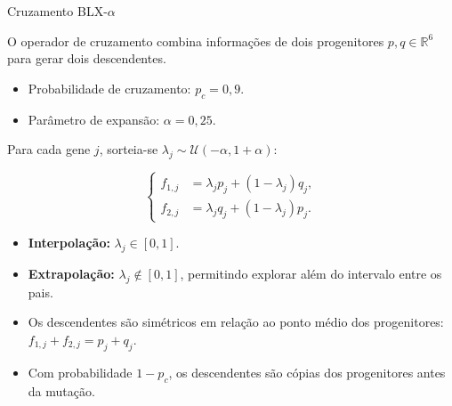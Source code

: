 \begin{frame}{Cruzamento BLX-$\alpha$}

  O operador de cruzamento combina informações de dois
  progenitores $p,q\in\mathbb{R}^{6}$ para gerar dois descendentes.

  \begin{itemize}
    \item Probabilidade de cruzamento: $p_c=0{,}9$.
    \item Parâmetro de expansão: $\alpha=0{,}25$.
  \end{itemize}

  Para cada gene $j$, sorteia-se
  $\lambda_j\sim\mathcal{U}(-\alpha,1+\alpha)$:

  \[
    \left\{
    \begin{aligned}
      f_{1,j}&=\lambda_j p_j+(1-\lambda_j)q_j,\\
      f_{2,j}&=\lambda_j q_j+(1-\lambda_j)p_j.
    \end{aligned}
    \right.
  \]

  \begin{itemize}
    \item \textbf{Interpolação:} $\lambda_j\in[0,1]$.
    \item \textbf{Extrapolação:} $\lambda_j\notin[0,1]$,
          permitindo explorar além do intervalo entre os pais.
    \item Os descendentes são simétricos em relação ao ponto
          médio dos progenitores:
          $f_{1,j}+f_{2,j}=p_j+q_j$.
    \item Com probabilidade $1-p_c$, os descendentes são
          cópias dos progenitores antes da mutação.
  \end{itemize}

\end{frame}

